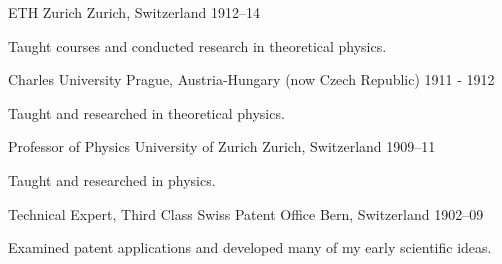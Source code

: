 \begin{cventries}
    
    {ETH Zurich} %
    {Zurich, Switzerland} %
    {1912--14} %
    {
      \begin{cvitems}
        \item {Taught courses and conducted research in theoretical physics.}
      \end{cvitems}
    }


    {Charles University} %
    {Prague, Austria-Hungary (now Czech Republic)} %
    {1911 - 1912} %
    {
      \begin{cvitems}
        \item {Taught and researched in theoretical physics.}
      \end{cvitems}
    }


  \cventry
    {Professor of Physics} %
    {University of Zurich} %
    {Zurich, Switzerland} %
    {1909--11} %
    {
      \begin{cvitems}
        \item {Taught and researched in physics.}
      \end{cvitems}
    }


  \cventry
    {Technical Expert, Third Class} %
    {Swiss Patent Office} %
    {Bern, Switzerland} %
    {1902--09} %
    {
      \begin{cvitems}
        \item {Examined patent applications and developed many of my early 
        scientific ideas.}
      \end{cvitems}
    }


\end{cventries}
